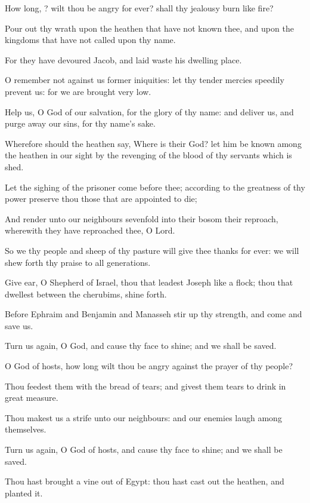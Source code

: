 \Verse How long, \LORD? wilt thou be angry for ever? shall thy jealousy burn like fire?

\Verse Pour out thy wrath upon the heathen that have not known thee, and upon the kingdoms that have not called upon thy name.

\Verse For they have devoured Jacob, and laid waste his dwelling place.

\Verse O remember not against us former iniquities: let thy tender mercies speedily prevent us: for we are brought very low.

\Verse Help us, O God of our salvation, for the glory of thy name: and deliver us, and purge away our sins, for thy name's sake.

\Verse Wherefore should the heathen say, Where is their God? let him be known among the heathen in our sight by the revenging of the blood of thy servants which is shed.

\Verse Let the sighing of the prisoner come before thee; according to the greatness of thy power preserve thou those that are appointed to die;

\Verse And render unto our neighbours sevenfold into their bosom their reproach, wherewith they have reproached thee, O Lord.

\Verse So we thy people and sheep of thy pasture will give thee thanks for ever: we will shew forth thy praise to all generations.




\Chapter
\Verse Give ear, O Shepherd of Israel, thou that leadest Joseph like a flock; thou that dwellest between the cherubims, shine forth.

\Verse Before Ephraim and Benjamin and Manasseh stir up thy strength, and come and save us.

\Verse Turn us again, O God, and cause thy face to shine; and we shall be saved.

\Verse O \LORD God of hosts, how long wilt thou be angry against the prayer of thy people?

\Verse Thou feedest them with the bread of tears; and givest them tears to drink in great measure.

\Verse Thou makest us a strife unto our neighbours: and our enemies laugh among themselves.

\Verse Turn us again, O God of hosts, and cause thy face to shine; and we shall be saved.

\Verse Thou hast brought a vine out of Egypt: thou hast cast out the heathen, and planted it.

